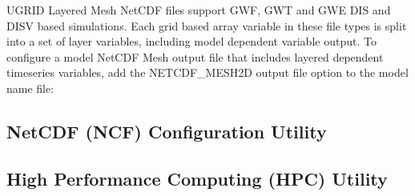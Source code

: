 \mf UGRID Layered Mesh NetCDF files support GWF, GWT and GWE DIS and DISV based simulations. Each grid based array variable in these file types is split into a set of layer variables, including model dependent variable output. To configure a model NetCDF Mesh output file that includes layered dependent timeseries variables, add the NETCDF\_MESH2D output file option to the model name file:


\newpage
\subsection{NetCDF (NCF) Configuration Utility}


\newpage
\subsection{High Performance Computing (HPC) Utility}


